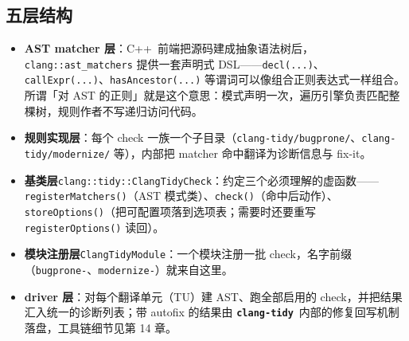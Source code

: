 \documentclass[12pt,a4paper,fontset=fandol]{ctexbook}
\newcommand{\Fn}[1]{\texttt{#1()}}
\newcommand{\Tp}[1]{\texttt{#1}}
\newcommand{\Bk}{\discretionary{}{}{}}
\newcommand{\Lib}[1]{\textbf{\texttt{#1}}}
\newcommand{\Lang}[1]{\textsf{#1}}
\newcommand{\CPP}{\Lang{C++}}
\newcommand{\Tidy}{\Lib{clang-tidy}}
\begin{document}
\subsection{五层结构}\label{sec:ch12-s1a}
\begin{itemize}
\item \textbf{AST matcher 层}：\CPP\ 前端把源码建成抽象语法树后，\texttt{clang::ast\_matchers} 提供一套声明式 DSL——\texttt{decl(...)}、\texttt{callExpr(...)}、\texttt{hasAncestor(...)} 等谓词可以像组合正则表达式一样组合。所谓「对 AST 的正则」就是这个意思：模式声明一次，遍历引擎负责匹配整棵树，规则作者不写递归访问代码。
\item \textbf{规则实现层}：每个 check 一族一个子目录（\texttt{clang-tidy/}\allowbreak\texttt{bugprone/}、\texttt{clang-tidy/}\allowbreak\texttt{modernize/} 等），内部把 matcher 命中翻译为诊断信息与 fix-it。
\item \textbf{基类层}\Tp{clang::tidy::Clang{\Bk}Tidy{\Bk}Check}：约定三个必须理解的虚函数——\Fn{register{\Bk}Matchers}（AST 模式类）、\Fn{check}（命中后动作）、\Fn{store{\Bk}Options}（把可配置项落到选项表；需要时还要重写 \Fn{register{\Bk}Options} 读回）。
\item \textbf{模块注册层}\Tp{Clang{\Bk}Tidy{\Bk}Module}：一个模块注册一批 check，名字前缀（\texttt{bugprone-}、\texttt{modernize-}）就来自这里。
\item \textbf{driver 层}：对每个翻译单元（TU）建 AST、跑全部启用的 check，并把结果汇入统一的诊断列表；带 autofix 的结果由 \Tidy\ 内部的修复回写机制落盘，工具链细节见第 14 章。
\end{itemize}
\end{document}

